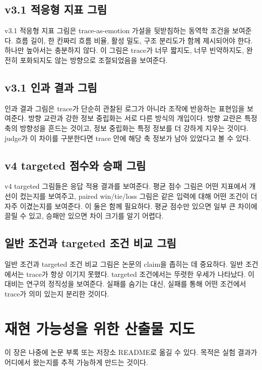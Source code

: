 \documentclass[11pt,a4paper]{article}
\begin{document}
\subsection{v3.1 적응형 지표 그림}

v3.1 적응형 지표 그림은 trace-as-emotion 가설을 뒷받침하는 동역학 조건을 보여준다. 흐름 길이, 한 칸짜리 흐름 비율, 활성 밀도, 구조 분리도가 함께 제시되어야 한다. 하나만 높아서는 충분하지 않다. 이 그림은 trace가 너무 짧지도, 너무 빈약하지도, 완전히 포화되지도 않는 방향으로 조절되었음을 보여준다.

\subsection{v3.1 인과 결과 그림}

인과 결과 그림은 trace가 단순히 관찰된 로그가 아니라 조작에 반응하는 표현임을 보여준다. 방향 교란과 강한 정보 중립화는 서로 다른 방식의 개입이다. 방향 교란은 특정 축의 방향성을 흔드는 것이고, 정보 중립화는 특정 정보를 더 강하게 지우는 것이다. judge가 이 차이를 구분한다면 trace 안에 해당 축 정보가 남아 있었다고 볼 수 있다.

\subsection{v4 targeted 점수와 승패 그림}

v4 targeted 그림들은 응답 적용 결과를 보여준다. 평균 점수 그림은 어떤 지표에서 개선이 컸는지를 보여주고, paired win/tie/loss 그림은 같은 입력에 대해 어떤 조건이 더 자주 이겼는지를 보여준다. 이 둘은 함께 필요하다. 평균 점수만 있으면 일부 큰 차이에 끌릴 수 있고, 승패만 있으면 차이 크기를 알기 어렵다.

\subsection{일반 조건과 targeted 조건 비교 그림}

일반 조건과 targeted 조건 비교 그림은 논문의 claim을 좁히는 데 중요하다. 일반 조건에서는 trace가 항상 이기지 못했다. targeted 조건에서는 뚜렷한 우세가 나타났다. 이 대비는 연구의 정직성을 보여준다. 실패를 숨기는 대신, 실패를 통해 어떤 조건에서 trace가 의미 있는지 분리한 것이다.

\section{재현 가능성을 위한 산출물 지도}

이 장은 나중에 논문 부록 또는 저장소 README로 옮길 수 있다. 목적은 실험 결과가 어디에서 왔는지를 추적 가능하게 만드는 것이다.
\end{document}
